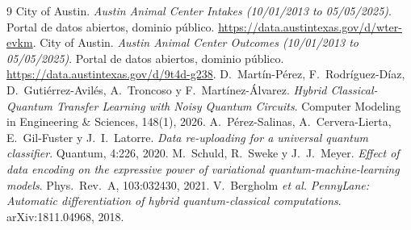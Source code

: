 \documentclass[11pt,letterpaper]{article}
\begin{document}
\begin{thebibliography}{9}
 City of Austin. \emph{Austin Animal Center Intakes (10/01/2013 to
05/05/2025)}. Portal de datos abiertos, dominio público.
\url{https://data.austintexas.gov/d/wter-evkm}.
 City of Austin. \emph{Austin Animal Center Outcomes (10/01/2013 to
05/05/2025)}. Portal de datos abiertos, dominio público.
\url{https://data.austintexas.gov/d/9t4d-g238}.
 D.\ Martín-Pérez, F.\ Rodríguez-Díaz, D.\ Gutiérrez-Avilés, A.\ Troncoso y
F.\ Martínez-Álvarez. \emph{Hybrid Classical-Quantum Transfer Learning with Noisy Quantum Circuits}.
Computer Modeling in Engineering \& Sciences, 148(1), 2026.
 A.\ Pérez-Salinas, A.\ Cervera-Lierta, E.\ Gil-Fuster y J.\ I.\ Latorre.
\emph{Data re-uploading for a universal quantum classifier}. Quantum, 4:226, 2020.
 M.\ Schuld, R.\ Sweke y J.\ J.\ Meyer. \emph{Effect of data encoding on the
expressive power of variational quantum-machine-learning models}. Phys.\ Rev.\ A, 103:032430, 2021.
 V.\ Bergholm \emph{et al.} \emph{PennyLane: Automatic differentiation of hybrid
quantum-classical computations}. arXiv:1811.04968, 2018.
\end{thebibliography}
\end{document}
